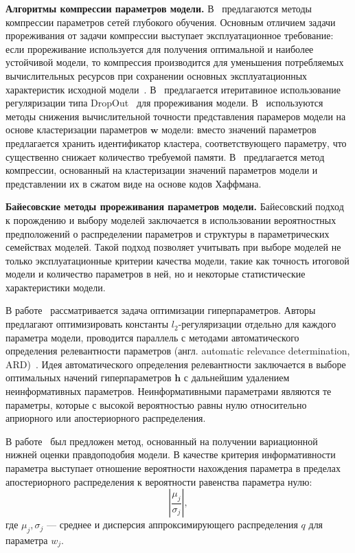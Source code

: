 \textbf{Алгоритмы компрессии параметров модели.}
В~\cite{weight_quantization, weight_quantization2,nvidia_prune} предлагаются методы компрессии параметров сетей глубокого обучения. Основным отличием задачи прореживания от задачи компрессии выступает эксплуатационное требование: если прореживание используется для получения оптимальной и наиболее устойчивой модели, то компрессия производится для уменьшения потребляемых вычислительных ресурсов при сохранении основных эксплуатационных характеристик исходной модели~\cite{weight_quantization2}.
В~\cite{nvidia_prune}
предлагается итеритавиное использование регуляризации типа DropOut~\cite{dropout} для прореживания модели. 
В~\cite{weight_quantization, weight_quantization2} используются методы снижения вычислительной точности представления парамеров модели на основе кластеризации параметров $\mathbf{w}$ модели: вместо значений параметров предлагается хранить идентификатор кластера, соответствующего параметру, что существенно снижает количество требуемой памяти.
В~\cite{weight_quantization2} предлагается метод компрессии, основанный на кластеризации значений параметров модели и представлении их в сжатом виде на основе кодов Хаффмана.

\textbf{Байесовские методы прореживания параметров модели. }
Байесовский подход к порождению и выбору моделей заключается в использовании вероятностных предположений о распределении параметров и структуры в параметрических семействах моделей. Такой подход позволяет учитывать при выборе моделей не только эксплуатационные критерии качества модели, такие как точность итоговой модели и количество параметров в ней, но и некоторые статистические характеристики модели. 

В работе~\cite{hyper} рассматривается задача оптимизации гиперпараметров.  Авторы предлагают оптимизировать константы $l_2$-регуляризации отдельно для каждого параметра модели, проводится параллель с методами автоматического определения релевантности параметров (англ. automatic relevance determination, ARD)~\cite{mackay}. 
Идея автоматического определения релевантности заключается в выборе оптимальных начений гиперпараметров $\mathbf{h}$ с дальнейшим удалением неинформативных параметров. Неинформативными параметрами являются те параметры, которые с высокой вероятностью равны нулю относительно априорного или апостериорного распределения.

В работе~\cite{nips} был предложен метод, основанный на получении вариационной нижней оценки правдоподобия модели. В качестве критерия информативности параметра выступает отношение вероятности нахождения параметра в пределах апостериорного распределения к вероятности равенства параметра нулю:
\[
    \left|\frac{\mu_j}{\sigma_j}\right|,  
\]
где $\mu_j, \sigma_j$ --- среднее и дисперсия аппроксимирующего распределения $q$ для параметра $w_j$.

